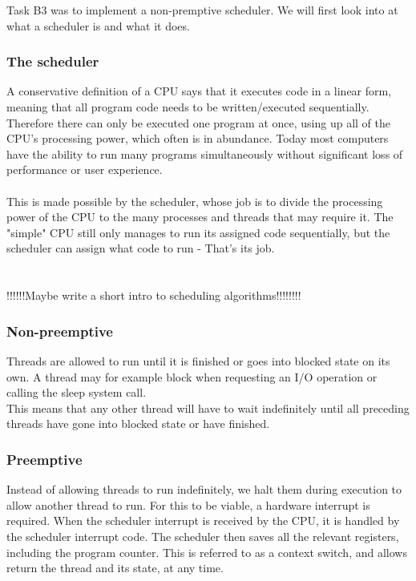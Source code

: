 Task B3 was to implement a non-premptive scheduler. We will first look into at what a scheduler is and what it does.

\subsubsection{The scheduler}
A conservative definition of a CPU says that it executes code in a linear form, meaning that all program code needs to be written/executed sequentially. Therefore there can only be executed one program at once, using up all of the CPU's processing power, which often is in abundance. Today most computers have the ability to run many programs simultaneously without significant loss of performance or user experience.\\
\\
This is made possible by the scheduler, whose job is to divide the processing power of the CPU to the many processes and threads that may require it. The "simple" CPU still only manages to run its assigned code sequentially, but the scheduler can assign what code to run - That's its job.
\\
\\
\\
!!!!!!Maybe write a short intro to scheduling algorithms!!!!!!!!
\subsubsection{Non-preemptive}
Threads are allowed to run until it is finished or goes into blocked state on its own. A thread may for example block when requesting an I/O operation or calling the sleep system call.
\\
This means that any other thread will have to wait indefinitely until all preceding threads have gone into blocked state or have finished. 

\subsubsection{Preemptive}
Instead of allowing threads to run indefinitely, we halt them during execution to allow another thread to run. For this to be viable, a hardware interrupt is required. When the scheduler interrupt is received by the CPU, it is handled by the scheduler interrupt code. The scheduler then saves all the relevant registers, including the program counter. This is referred to as a context switch, and allows return the thread and its state, at any time.

